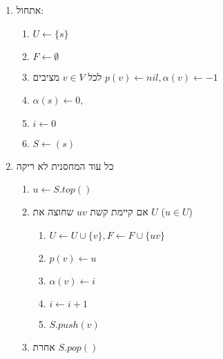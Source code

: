 \begin{enumerate}
\item
אתחול:
\begin{enumerate}
\item
$U \leftarrow \{s\}$
\item
$F \leftarrow \emptyset$
\item
לכל 
$v \in V$
מציבים
$p(v) \leftarrow nil, \alpha(v) \leftarrow -1$
\item
$\alpha(s) \leftarrow 0$,
\item
$i \leftarrow 0$
\item
$S \leftarrow (s)$
\end{enumerate}

\item
כל עוד המחסנית לא ריקה
\begin{enumerate}
	\item
	$u \leftarrow S.top()$
	\item 
	אם קיימת קשת 
	$uv$
	שחוצה את $U$ 
	($u \in U$)
		\begin{enumerate}
		\item
		$U \leftarrow U \cup \{v\}, F \leftarrow F \cup \{uv\}$
		\item
		$p(v) \leftarrow u$
		\item
		$\alpha(v) \leftarrow i$
		\item
		$i \leftarrow i + 1$
		\item
		$S.push(v)$
		\end{enumerate}
	\item
	אחרת 
	$S.pop()$
	\end{enumerate}
\end{enumerate}

